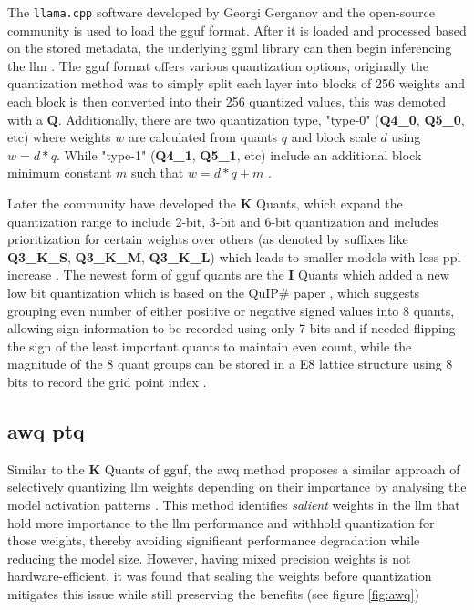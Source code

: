 \documentclass{ifacconf}
\begin{document}
	The \texttt{llama.cpp} software developed by Georgi Gerganov and the open-source community is used to load the \gls{gguf} format. After it is loaded and processed based on the stored metadata, the underlying \gls{ggml} library can then begin inferencing the \gls{llm} \cite{ggufgithub}. The \gls{gguf} format offers various quantization options, originally the quantization method was to simply split each layer into blocks of 256 weights and each block is then converted into their 256 quantized values, this was demoted with a \textbf{Q}. Additionally, there are two quantization type, "type-0" (\textbf{Q4\_0}, \textbf{Q5\_0}, etc) where weights $w$ are calculated from quants $q$ and block scale $d$ using $w = d * q$. While "type-1" (\textbf{Q4\_1}, \textbf{Q5\_1}, etc) include an additional block minimum constant $m$ such that $w = d * q + m$ \cite{ggufgithubquantdoc, ggufgithubkquantpr}. 
	
	Later the community have developed the \textbf{K} Quants, which expand the quantization range to include 2-bit, 3-bit and 6-bit quantization and includes prioritization for certain weights over others (as denoted by suffixes like \textbf{Q3\_K\_S}, \textbf{Q3\_K\_M}, \textbf{Q3\_K\_L}) which leads to smaller models with less \gls{ppl} increase \cite{ggufgithubkquantpr}. The newest form of \gls{gguf} quants are the \textbf{I} Quants which added a new low bit quantization \cite{ggufgithubiquantpr} which is based on the QuIP\# paper \cite{tseng2024quipbetterllmquantization}, which suggests grouping even number of either positive or negative signed values into 8 quants, allowing sign information to be recorded using only 7 bits and if needed flipping the sign of the least important quants to maintain even count, while the magnitude of the 8 quant groups can be stored in a E8 lattice structure using 8 bits to record the grid point index \cite{ggufgithubiquantpr}. 
	
	\subsection{\gls{awq} \gls{ptq}}
	
	Similar to the \textbf{K} Quants of \gls{gguf}, the \gls{awq} method proposes a similar approach of selectively quantizing \gls{llm} weights depending on their importance by analysing the model activation patterns \cite{lin2024awqactivationawareweightquantization}. This method identifies \textit{salient} weights in the \gls{llm} that hold more importance to the \gls{llm} performance and withhold quantization for those weights, thereby avoiding significant performance degradation while reducing the model size. However, having  mixed precision weights is not hardware-efficient, it was found that scaling the weights before quantization mitigates this issue while still preserving the benefits (see figure \ref{fig:awq})
	
\end{document}
